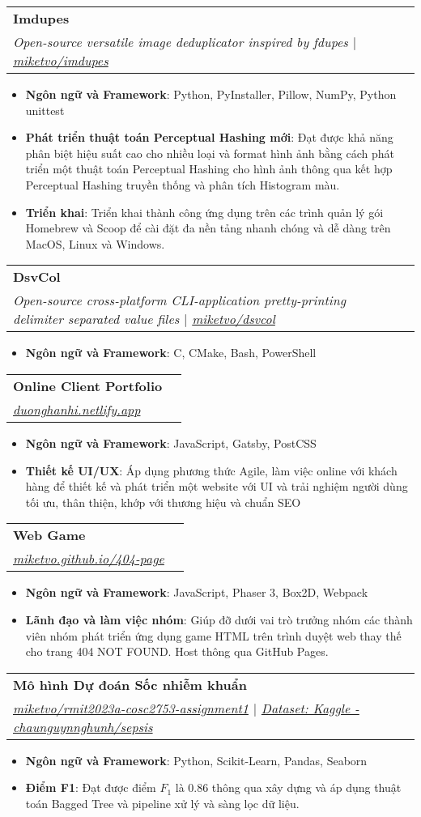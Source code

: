 \documentclass[a4paper,11pt]{article}
\makeatletter
\newcommand{\resumeItem}[2]{
  \item\small{
    \textbf{#1}{: #2 \vspace{-2pt}}
  }
}
\newcommand{\resumeSubheading}[4]{
  \vspace{-1pt}\item
    \begin{tabular*}{0.97\textwidth}{l@{\extracolsep{\fill}}r}
      \textbf{#1} & #2 \\
      \textit{\small#3} & \textit{\small #4} \\
    \end{tabular*}\vspace{-5pt}
}
\newcommand{\resumeItemListStart}{\begin{itemize}}
\newcommand{\resumeItemListEnd}{\end{itemize}\vspace{-5pt}}
\makeatother
\begin{document}
    \resumeSubheading
      {Imdupes}{}
      {Open-source versatile image deduplicator inspired by fdupes $|$ \href{https://github.com/miketvo/imdupes}{\faGithub\space miketvo/imdupes}}{}
      \resumeItemListStart
        \resumeItem{Ngôn ngữ và Framework}
          {Python, PyInstaller, Pillow, NumPy, Python unittest}
        \resumeItem{Phát triển thuật toán Perceptual Hashing mới}
          {Đạt được khả năng phân biệt hiệu suất cao cho nhiều loại và format hình ảnh bằng cách phát triển một thuật toán Perceptual Hashing cho hình ảnh thông qua kết hợp Perceptual Hashing truyền thống và phân tích Histogram màu.}
        \resumeItem{Triển khai}
          {Triển khai thành công ứng dụng trên các trình quản lý gói Homebrew và Scoop để cài đặt đa nền tảng nhanh chóng và dễ dàng trên MacOS, Linux và Windows.}
      \resumeItemListEnd

    \resumeSubheading
      {DsvCol}{}
      {Open-source cross-platform CLI-application pretty-printing delimiter separated value files $|$ \href{https://github.com/miketvo/dsvcol}{\faGithub\space miketvo/dsvcol}}{}
      \resumeItemListStart
        \resumeItem{Ngôn ngữ và Framework}
          {C, CMake, Bash, PowerShell}
      \resumeItemListEnd

    \resumeSubheading
      {Online Client Portfolio}{}
      {\href{https://duonghanhi.netlify.app/}{\faGlobe\space duonghanhi.netlify.app}}{}
      \resumeItemListStart
        \resumeItem{Ngôn ngữ và Framework}
          {JavaScript, Gatsby, PostCSS}
        \resumeItem{Thiết kế UI/UX}
          {Áp dụng phương thức Agile, làm việc online với khách hàng để thiết kế và phát triển một website với UI và trải nghiệm người dùng tối ưu, thân thiện, khớp với thương hiệu và chuẩn SEO}
      \resumeItemListEnd

    \resumeSubheading
      {Web Game}{}
      {\href{https://miketvo.github.io/404-page.html}{\faGlobe\space miketvo.github.io/404-page}}{}
      \resumeItemListStart
        \resumeItem{Ngôn ngữ và Framework}
          {JavaScript, Phaser 3, Box2D, Webpack}
        \resumeItem{Lãnh đạo và làm việc nhóm}
          {Giúp đỡ dưới vai trò trưởng nhóm các thành viên nhóm phát triển ứng dụng game HTML trên trình duyệt web thay thế cho trang 404 NOT FOUND. Host thông qua GitHub Pages.}
      \resumeItemListEnd

    \resumeSubheading
      {Mô hình Dự đoán Sốc nhiễm khuẩn}{}
      {\href{https://github.com/miketvo/rmit2023a-cosc2753-assignment1}{\faGithub\space miketvo/rmit2023a-cosc2753-assignment1} $|$ \href{https://www.kaggle.com/datasets/chaunguynnghunh/sepsis/}{\faDatabase\space Dataset: Kaggle - chaunguynnghunh/sepsis}}{}
      \resumeItemListStart
        \resumeItem{Ngôn ngữ và Framework}
          {Python, Scikit-Learn, Pandas, Seaborn}
        \resumeItem{Điểm F1}
          {Đạt được điểm $F_1$ là 0.86 thông qua xây dựng và áp dụng thuật toán Bagged Tree và pipeline xử lý và sàng lọc dữ liệu.}
      \resumeItemListEnd
\end{document}
